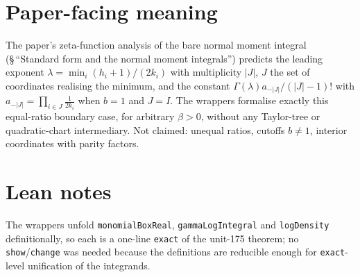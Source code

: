 \documentclass[11pt]{article}
\begin{document}
\section{Paper-facing meaning}
The paper's zeta-function analysis of the bare normal moment integral (\S\,``Standard form and the
normal moment integrals'') predicts the leading exponent $\lambda=\min_i(h_i+1)/(2k_i)$ with
multiplicity $|J|$, $J$ the set of coordinates realising the minimum, and the constant
$\Gamma(\lambda)a_{-|J|}/(|J|-1)!$ with $a_{-|J|}=\prod_{i\in J}\frac1{2k_i}$ when $b=1$ and $J=I$.
The wrappers formalise exactly this equal-ratio boundary case, for arbitrary $\beta>0$, without any
Taylor-tree or quadratic-chart intermediary. Not claimed: unequal ratios, cutoffs $b\neq1$, interior
coordinates with parity factors.

\section{Lean notes}
The wrappers unfold \texttt{monomialBoxReal}, \texttt{gammaLogIntegral} and \texttt{logDensity}
definitionally, so each is a one-line \texttt{exact} of the unit-175 theorem; no
\texttt{show}/\texttt{change} was needed because the definitions are reducible enough for
\texttt{exact}-level unification of the integrands.
\end{document}
